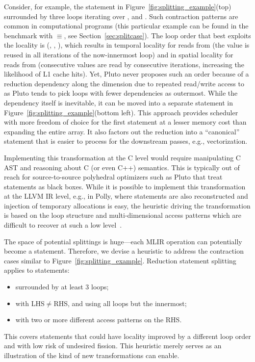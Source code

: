 Consider, for example, the statement  in Figure~\ref{fig:splitting_example}(top) surrounded by three loops iterating over ,  and . Such contraction patterns are common in computational programs (this particular example can be found in the  benchmark with $\equiv$, see Section~\ref{sec:splitcase}). The loop order that best exploits the locality is (, , ), which results in temporal locality for reads from  (the value is reused in all iterations of the now-innermost  loop) and in spatial locality for reads from  (consecutive values are read by consecutive iterations, increasing the likelihood of L1 cache hits). Yet, Pluto never proposes such an order because of a reduction dependency along the  dimension due to repeated read/write access to  as Pluto tends to pick loops with fewer dependencies as outermost.
While the dependency itself is inevitable, it can be moved into a separate statement  in Figure~\ref{fig:splitting_example}(bottom left). This approach provides scheduler with more freedom of choice for the first statement at a lesser memory cost than expanding the entire  array. It also factors out the reduction into a ``canonical'' statement that is easier to process for the downstream passes, e.g., vectorization.

Implementing this transformation at the C level would require manipulating C AST and reasoning about C (or even C++) semantics. This is typically out of reach for source-to-source polyhedral optimizers such as Pluto that treat statements as black boxes. While it is possible to implement this transformation at the LLVM IR level, e.g., in Polly, where statements are also reconstructed and injection of temporary allocations is easy, the heuristic driving the transformation is based on the loop structure and multi-dimensional access patterns which are difficult to recover at such a low level~\cite{delinearization}.

The space of potential splittings is huge---each MLIR operation can potentially become a statement. Therefore, we devise a heuristic to address the contraction cases similar to Figure~\ref{fig:splitting_example}. Reduction statement splitting applies to statements:
\begin{itemize}
  \item surrounded by at least 3 loops;
  \item with LHS$\neq$RHS, and using all loops but the innermost;
  \item with two or more different access patterns on the RHS.
\end{itemize}
This covers statements that could have locality improved by a different loop order and with low risk of undesired fission.
This heuristic merely serves as an illustration of the kind of new transformations \tool can enable.